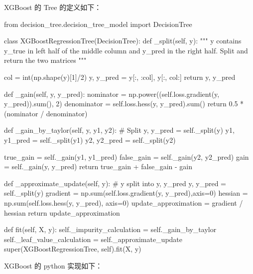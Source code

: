 \documentclass[12pt]{article}
\begin{document}
XGBoost 的 Tree 的定义如下：
\begin{python}
from decision_tree.decision_tree_model import DecisionTree

class XGBoostRegressionTree(DecisionTree):
    def _split(self, y):
        """ y contains y_true in left half of the middle column and
        y_pred in the right half. Split and return the two matrices """

        col = int(np.shape(y)[1]/2)
        y, y_pred = y[:, :col], y[:, col:]
        return y, y_pred
 
    def _gain(self, y, y_pred):
        nominator = np.power((self.loss.gradient(y, y_pred)).sum(), 2)
        denominator = self.loss.hess(y, y_pred).sum()
        return 0.5 * (nominator / denominator)
 
    def _gain_by_taylor(self, y, y1, y2):
        # Split
        y, y_pred = self._split(y)
        y1, y1_pred = self._split(y1)
        y2, y2_pred = self._split(y2)
 
        true_gain = self._gain(y1, y1_pred)
        false_gain = self._gain(y2, y2_pred)
        gain = self._gain(y, y_pred)
        return true_gain + false_gain - gain
 
    def _approximate_update(self, y):
        # y split into y, y_pred
        y, y_pred = self._split(y)
        gradient = np.sum(self.loss.gradient(y, y_pred),axis=0)
        hessian = np.sum(self.loss.hess(y, y_pred), axis=0)
        update_approximation =  gradient / hessian
        return update_approximation
 
 
    def fit(self, X, y):
        self._impurity_calculation = self._gain_by_taylor
        self._leaf_value_calculation = self._approximate_update
        super(XGBoostRegressionTree, self).fit(X, y)
\end{python}

XGBoost 的 python 实现如下：
\end{document}
